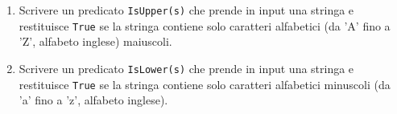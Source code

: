 \documentclass[11pt,a4]{article}
\begin{document}
\begin{enumerate}
\item Scrivere un predicato {\tt IsUpper(s)} che prende in input una stringa e restituisce {\tt True}
se la stringa contiene solo caratteri alfabetici (da 'A' fino a 'Z', alfabeto inglese) maiuscoli.

\item Scrivere un predicato {\tt IsLower(s)} che prende in input una stringa e restituisce {\tt True}
se la stringa contiene solo caratteri alfabetici minuscoli (da 'a' fino a 'z', alfabeto inglese).
\end{enumerate}
\end{document}
